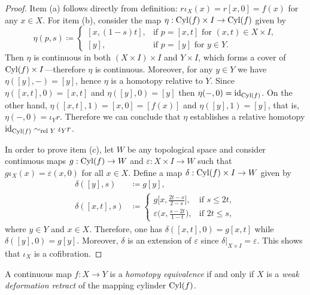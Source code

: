 \begin{proof}
Item (a) follows directly from definition: \(r \iota_X(x) = r[x, 0] = f(x)\) for
any \(x \in X\). For item (b), consider the map \(\eta: \operatorname{Cyl}(f) \times I \to
\operatorname{Cyl}(f)\) given by
\[
\eta(p, s) \coloneq
\begin{cases}
  [x, (1 - s) t], &\text{if } p = [x, t]
                        \text{ for } (x, t) \in X \times I, \\
  [y], &\text{if } p = [y] \text{ for } y \in Y.
\end{cases}
\]
Then \(\eta\) is continuous in both \((X \times I) \times I\) and
\(Y \times I\), which forms a cover of \(\operatorname{Cyl}(f) \times I\)---therefore \(\eta\)
is continuous. Moreover, for any \(y \in Y\) we have \(\eta([y], -) = [y]\),
hence \(\eta\) is a homotopy relative to \(Y\). Since
\(\eta([x, t], 0) = [x, t]\) and \(\eta([y], 0) = [y]\) then
\(\eta(-, 0) = \operatorname{id}_{\operatorname{Cyl}(f)}\). On the other hand,
\(\eta([x, t], 1) = [x, 0] = [f(x)]\) and \(\eta([y], 1) = [y]\), that is,
\(\eta(-, 0) = \iota_Y r\). Therefore we can conclude that \(\eta\) establishes
a relative homotopy \(\operatorname{id}_{\operatorname{Cyl}(f)} \sim_{\text{rel }{Y}} \iota_Y r\).

In order to prove item (c), let \(W\) be any topological space and consider
continuous maps \(g: \operatorname{Cyl}(f) \to W\) and \(\varepsilon: X \times I \to W\) such
that \(g \iota_X(x) = \varepsilon(x, 0)\) for all \(x \in X\). Define a map
\(\delta: \operatorname{Cyl}(f) \times I \to W\) given by
\begin{align*}
\delta([y], s)    &\coloneq g[y], \\
\delta([x, t], s) &\coloneq
\begin{cases}
g\big[x, \frac{2 t - s}{2 - s}\big],
&\text{if } s \leq 2 t,
\\
\varepsilon\big(x, \frac{s - 2 t}{1 - t}\big),
&\text{if } 2 t \leq s,
\end{cases}
\end{align*}
where \(y \in Y\) and \(x \in X\). Therefore, one has
\(\delta([x, t], 0) = g[x, t]\) while \(\delta([y], 0) = g[y]\). Moreover,
\(\delta\) is an extension of \(\varepsilon\) since
\(\delta|_{X \times I} = \varepsilon\). This shows that \(\iota_X\) is a
cofibration.
\end{proof}

\begin{lemma}
\label{lem:htpy-equivalence-iff-weak-def-retract}
A continuous map \(f: X \to Y\) is a \emph{homotopy equivalence} if and only if
\(X\) is a \emph{weak deformation retract} of the mapping cylinder \(\operatorname{Cyl}(f)\).
\end{lemma}

